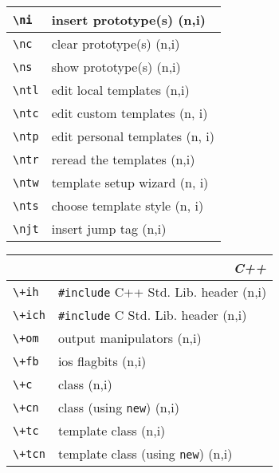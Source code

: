 \documentclass[oneside,11pt,landscape,DIV16]{scrartcl}
\begin{document}
\begin{multicols}{3}
\begin{center}
\begin{tabular}[]{|p{11mm}|p{60mm}|}
\hline     \verb'\ni'  & insert prototype(s)       \hfill (n,i)\\
\hline     \verb'\nc'  & clear  prototype(s)       \hfill (n,i)\\
\hline     \verb'\ns'  & show   prototype(s)       \hfill (n,i)\\
%
\hline     \verb'\ntl' & edit local templates      \hfill (n,i)\\
\hline     \verb'\ntc' & edit custom templates     \hfill (n, i)\\
\hline     \verb'\ntp' & edit personal templates   \hfill (n, i)\\
\hline     \verb'\ntr' & reread the templates      \hfill (n,i)\\
\hline     \verb'\ntw' & template setup wizard     \hfill (n, i)\\
\hline     \verb'\nts' & choose template style     \hfill (n, i)\\
\hline     \verb'\njt' & insert jump tag           \hfill (n,i)\\
\hline
\end{tabular}
%
%
\begin{tabular}[]{|p{12mm}|p{60mm}|}
\hline 
\multicolumn{2}{|r|}{\textsl{C\textbf{++}}} \\
\hline \verb'\+ih'  & \verb$#include$ C++ Std. Lib. header \hfill (n,i)\\
\hline \verb'\+ich' & \verb$#include$ C   Std. Lib. header \hfill (n,i)\\
\hline \verb'\+om'  & output manipulators                  \hfill (n,i)\\
\hline \verb'\+fb'  & ios flagbits                         \hfill (n,i)\\
\hline
\hline \verb'\+c'   & class                                \hfill (n,i)\\
\hline \verb'\+cn'  & class (using \verb'new')             \hfill (n,i)\\
\hline \verb'\+tc'  & template class                       \hfill (n,i)\\
\hline \verb'\+tcn' & template class (using \verb'new')    \hfill (n,i)\\

\end{tabular}
\end{center}
\end{multicols}
\end{document}
